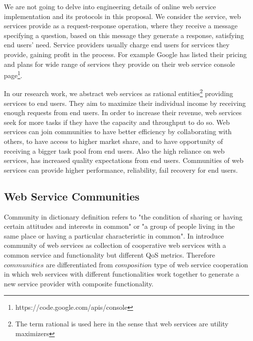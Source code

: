         We are not going to delve into engineering details of online web service implementation and its protocols in this proposal.
        We consider the service, web services provide as a request-response operation, where they receive a message specifying a question,
        based on this message they generate a response, satisfying end users' need. Service providers usually charge end users for services they provide,
        gaining profit in the process. For example Google has listed their pricing and plans for wide range of services they provide
        on their web service console page\footnote{https://code.google.com/apis/console}.

        In our research work, we abstract web services as rational entities\footnote{The term
        rational is used here in the sense that web services are utility
        maximizers} providing services to end users. They aim to maximize
        their individual income by receiving enough requests from end
        users. In order to increase their revenue, web services seek for
        more tasks if they have the capacity and throughput to do so. Web
        services can join communities to have better efficiency by
        collaborating with others, to have access to higher market share,
        and to have opportunity of receiving a bigger task pool from end
        users. Also the high reliance on web services, has increased quality expectations from end users.
        Communities of web services can provide higher performance, reliability, fail recovery for end users.

        \subsection{Web Service Communities}\label{sec:CWSDefinition}
        Community in dictionary definition refers to "the condition of sharing or having certain attitudes and interests in common" or "a group of people living in the same place or having a particular characteristic in common". In \cite{DBLP:journals/internet/BenatallahSD03, Zeng:2003:QDW:775152.775211} introduce community of web services as collection of cooperative web services with a common service and functionality but different QoS metrics. Therefore $communities$ are differentiated from $composition$ type of web service cooperation in which web services with different functionalities work together to generate a new service provider with composite functionality.


